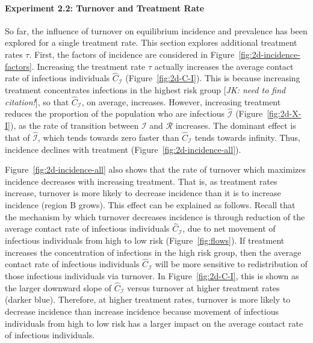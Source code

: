 \paragraph{Experiment 2.2: Turnover and Treatment Rate}
So far, the influence of turnover on equilibrium incidence and prevalence
has been explored for a single treatment rate.
This section explores additional treatment rates $\tau$.
First, the factors of incidence are considered in Figure~\ref{fig:2d-incidence-factors}.
Increasing the treatment rate $\tau$ actually increases
the average contact rate of infectious individuals $\hat{C}_{\mathcal{I}}$
(Figure~\ref{fig:2d-C-I}).
This is because increasing treatment concentrates infections in the highest risk group
[\textit{JK: need to find citation!}],
so that $\hat{C}_{\mathcal{I}}$, on average, increases.
However, increasing treatment reduces
the proportion of the population who are infectious $\hat{\mathcal{I}}$
(Figure~\ref{fig:2d-X-I}),
as the rate of transition between $\mathcal{I}$ and $\mathcal{R}$ increases.
The dominant effect is that of $\hat{\mathcal{I}}$,
which tends towards zero faster than $\hat{C}_{\mathcal{I}}$ tends towards infinity.
Thus, incidence declines with treatment
(Figure~\ref{fig:2d-incidence-all}).
\par
Figure~\ref{fig:2d-incidence-all} also shows that
the rate of turnover which maximizes incidence decreases with increasing treatment.
That is, as treatment rates increase,
turnover is more likely to decrease incidence than it is to increase incidence
(region B grows).
This effect can be explained as follows.
Recall that the mechanism by which turnover decreases incidence is through
reduction of the average contact rate of infectious individuals $\hat{C}_{\mathcal{I}}$,
due to net movement of infectious individuals from high to low risk
(Figure~\ref{fig:flows}).
If treatment increases the concentration of infections in the high risk group,
then the average contact rate of infectious individuals $\hat{C}_{\mathcal{I}}$
will be more sensitive to redistribution of those infectious individuals via turnover.
In Figure~\ref{fig:2d-C-I},
this is shown as the larger downward slope of $\hat{C}_{\mathcal{I}}$ versus turnover
at higher treatment rates (darker blue).
Therefore, at higher treatment rates,
turnover is more likely to decrease incidence than increase incidence
because movement of infectious individuals from high to low risk
has a larger impact on the average contact rate of infectious individuals.
